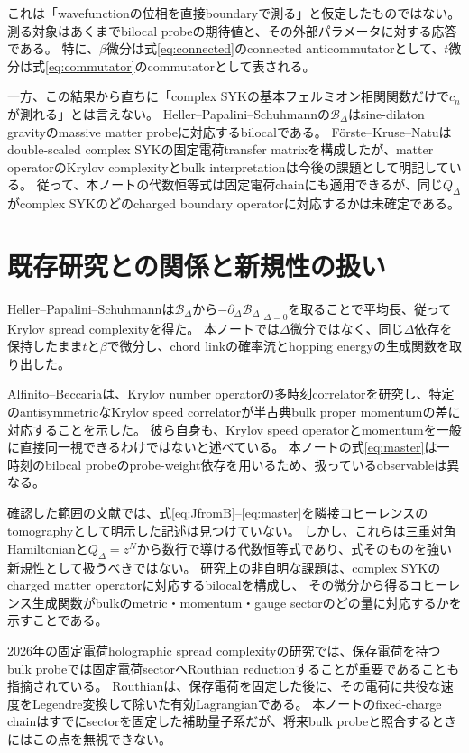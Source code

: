 \documentclass[a4paper,11pt]{ltjsarticle}
\numberwithin{equation}{section}
\begin{document}
これは「wavefunctionの位相を直接boundaryで測る」と仮定したものではない。
測る対象はあくまでbilocal probeの期待値と、その外部パラメータに対する応答である。
特に、$\beta$微分は式\eqref{eq:connected}のconnected anticommutatorとして、$t$微分は式\eqref{eq:commutator}のcommutatorとして表される。

一方、この結果から直ちに「complex SYKの基本フェルミオン相関関数だけで$c_n$が測れる」とは言えない。
Heller--Papalini--Schuhmannの$\mathcal B_\Delta$はsine-dilaton gravityのmassive matter probeに対応するbilocalである\cite{Heller}。
F\"orste--Kruse--Natuはdouble-scaled complex SYKの固定電荷transfer matrixを構成したが、matter operatorのKrylov complexityとbulk interpretationは今後の課題として明記している\cite{Forste}。
従って、本ノートの代数恒等式は固定電荷chainにも適用できるが、同じ$Q_\Delta$がcomplex SYKのどのcharged boundary operatorに対応するかは未確定である。

\section{既存研究との関係と新規性の扱い}
Heller--Papalini--Schuhmannは$\mathcal B_\Delta$から$-\partial_\Delta\mathcal B_\Delta|_{\Delta=0}$を取ることで平均長、従ってKrylov spread complexityを得た\cite{Heller}。
本ノートでは$\Delta$微分ではなく、同じ$\Delta$依存を保持したまま$t$と$\beta$で微分し、chord linkの確率流とhopping energyの生成関数を取り出した。

Alfinito--Beccariaは、Krylov number operatorの多時刻correlatorを研究し、特定のantisymmetricなKrylov speed correlatorが半古典bulk proper momentumの差に対応することを示した\cite{AlfinitoBeccaria}。
彼ら自身も、Krylov speed operatorとmomentumを一般に直接同一視できるわけではないと述べている。
本ノートの式\eqref{eq:master}は一時刻のbilocal probeのprobe-weight依存を用いるため、扱っているobservableは異なる。

確認した範囲の文献では、式\eqref{eq:JfromB}--\eqref{eq:master}を隣接コヒーレンスのtomographyとして明示した記述は見つけていない。
しかし、これらは三重対角Hamiltonianと$Q_\Delta=z^{\hat N}$から数行で導ける代数恒等式であり、式そのものを強い新規性として扱うべきではない。
研究上の非自明な課題は、complex SYKのcharged matter operatorに対応するbilocalを構成し、
その微分から得るコヒーレンス生成関数がbulkのmetric・momentum・gauge sectorのどの量に対応するかを示すことである。

2026年の固定電荷holographic spread complexityの研究では、保存電荷を持つbulk probeでは固定電荷sectorへRouthian reductionすることが重要であることも指摘されている\cite{FixedCharge}。
Routhianは、保存電荷を固定した後に、その電荷に共役な速度をLegendre変換して除いた有効Lagrangianである。
本ノートのfixed-charge chainはすでにsectorを固定した補助量子系だが、将来bulk probeと照合するときにはこの点を無視できない。
\end{document}
